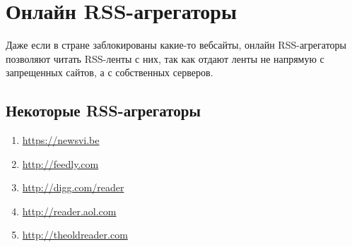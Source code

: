 \section{Онлайн RSS-агрегаторы}
Даже если в стране заблокированы какие-то вебсайты, онлайн RSS-агрегаторы позволяют читать RSS-ленты с них, так как отдают ленты не напрямую с запрещенных сайтов, а с собственных серверов.
\subsection{Некоторые RSS-агрегаторы}
\begin{enumerate}
\item \url{https://newsvi.be}
\item \url{http://feedly.com}
\item \url{http://digg.com/reader}
\item \url{http://reader.aol.com}
\item \url{http://theoldreader.com}
\end{enumerate}
